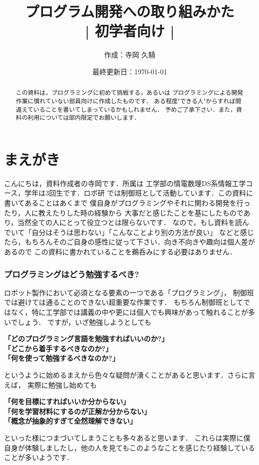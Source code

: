 \documentclass[autodetect-engine,dvi=dvipdfmx,ja=standard,a4j,12pt]{bxjsarticle}
\title{\textbf{プログラム開発への取り組みかた} \\
        | \Large{初学者向け} |}
\author{作成：寺岡 久騎}
\date{最終更新日：\today}
\begin{document}
\maketitle

\begin{abstract}
この資料は，プログラミングに初めて挑戦する，あるいは
プログラミングによる開発作業に慣れていない部員向けに作成したものです．
ある程度"できる人"からすれば間違えていることを書いてしまっているかもしれません．
予めご了承下さい．また，資料の利用については部内限定でお願いします．
\end{abstract}

\tableofcontents

\clearpage
\part*{まえがき}
こんにちは，資料作成者の寺岡です．所属は
工学部の情電数理DS系情報工学コース，学年は3回生です．ロボ研
では制御班として活動しています．この資料に書いてあることはあくまで
僕自身がプログラミングやそれに関わる開発を行ったり，人に教えたりした時の経験から
大事だと感じたことを基にしたものであり，当然全ての人にとって役立つとは限らないです．
なので，もし資料を読んでいて「自分はそうは思わない」「こんなことより別の方法が良い」
などと感じたら，もちろんそのご自身の感性に従って下さい．向き不向きや趣向は個人差があるので
この資料に書かれていることを鵜呑みにする必要はありません．

\clearpage

\section{プログラミングはどう勉強するべき?}
ロボット製作において必須となる要素の一つである「プログラミング」，
制御班では避けては通ることのできない超重要な作業です．
もちろん制御班としてではなく，特に工学部では講義の中や更には個人でも興味があって触れることが多いでしょう．
ですが，いざ勉強しようとしても
\begin{center}
    \textbf{「どのプログラミング言語を勉強すればいいのか?」\\
    「どこから着手するべきなのか?」\\
    「何を使って勉強するべきなのか?」}
\end{center}
というように始めるまえから色々な疑問が湧くことがあると思います．さらに言えば，
実際に勉強し始めても
\begin{center}
    \textbf{「何を目標にすればいいか分からない」\\
    「何を学習材料にするのが正解か分からない」\\
    「概念が抽象的すぎて全然理解できない」} 
\end{center}
といった様につまづいてしまうことも多々あると思います．
これらは実際に僕自身が体験しましたし，他の人を見てもこのようなことを感じたり経験している
ことが多いようです．
\end{document}
